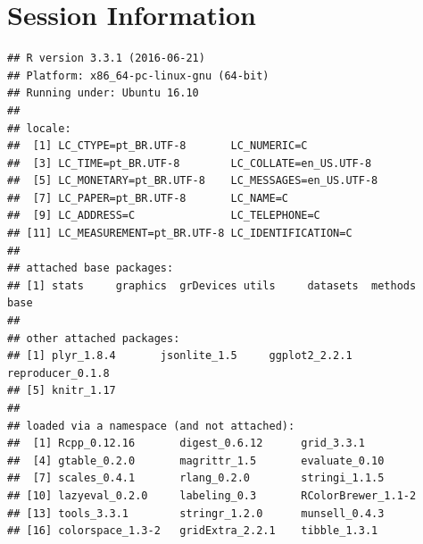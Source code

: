 \documentclass{article}\usepackage[]{graphicx}\usepackage[]{color}
\makeatletter
\newenvironment{kframe}{%
 \def\at@end@of@kframe{}%
 \ifinner\ifhmode%
  \def\at@end@of@kframe{\end{minipage}}%
  \begin{minipage}{\columnwidth}%
 \fi\fi%
 \def\FrameCommand##1{\hskip\@totalleftmargin \hskip-\fboxsep
 \colorbox{shadecolor}{##1}\hskip-\fboxsep
     \hskip-\linewidth \hskip-\@totalleftmargin \hskip\columnwidth}%
 \MakeFramed {\advance\hsize-\width
   \@totalleftmargin\z@ \linewidth\hsize
   \@setminipage}}%
 {\par\unskip\endMakeFramed%
 \at@end@of@kframe}
\newenvironment{knitrout}{}{} %
\makeatother
\begin{document}
	
	
		


	
\clearpage
\appendix
\section{Session Information}
\begin{knitrout}
\color{fgcolor}\begin{kframe}
\begin{verbatim}
## R version 3.3.1 (2016-06-21)
## Platform: x86_64-pc-linux-gnu (64-bit)
## Running under: Ubuntu 16.10
## 
## locale:
##  [1] LC_CTYPE=pt_BR.UTF-8       LC_NUMERIC=C              
##  [3] LC_TIME=pt_BR.UTF-8        LC_COLLATE=en_US.UTF-8    
##  [5] LC_MONETARY=pt_BR.UTF-8    LC_MESSAGES=en_US.UTF-8   
##  [7] LC_PAPER=pt_BR.UTF-8       LC_NAME=C                 
##  [9] LC_ADDRESS=C               LC_TELEPHONE=C            
## [11] LC_MEASUREMENT=pt_BR.UTF-8 LC_IDENTIFICATION=C       
## 
## attached base packages:
## [1] stats     graphics  grDevices utils     datasets  methods   base     
## 
## other attached packages:
## [1] plyr_1.8.4       jsonlite_1.5     ggplot2_2.2.1    reproducer_0.1.8
## [5] knitr_1.17      
## 
## loaded via a namespace (and not attached):
##  [1] Rcpp_0.12.16       digest_0.6.12      grid_3.3.1        
##  [4] gtable_0.2.0       magrittr_1.5       evaluate_0.10     
##  [7] scales_0.4.1       rlang_0.2.0        stringi_1.1.5     
## [10] lazyeval_0.2.0     labeling_0.3       RColorBrewer_1.1-2
## [13] tools_3.3.1        stringr_1.2.0      munsell_0.4.3     
## [16] colorspace_1.3-2   gridExtra_2.2.1    tibble_1.3.1
\end{verbatim}
\end{kframe}
\end{knitrout}
\end{document}
